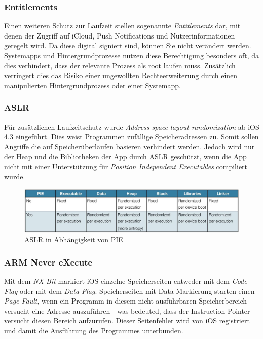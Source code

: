 		\subsubsection{Entitlements}
			Einen weiteren Schutz zur Laufzeit stellen sogenannte \textsl{Entitlements}
			dar, mit denen der Zugriff auf iCloud, Push	Notifications und
			Nutzerinformationen geregelt wird. Da diese digital signiert sind, können Sie
			nicht verändert werden. Systemapps und Hintergrundprozesse nutzen diese
			Berechtigung besonders oft, da dies verhindert, dass der relevante Prozess als
			root laufen muss. Zusätzlich verringert dies das Risiko einer ungewollten
			Rechteerweiterung durch einen manipulierten Hintergrundprozess oder einer
			Systemapp.
		
		\subsubsection{ASLR}
			Für zusätzlichen Laufzeitschutz wurde \textsl{Address space layout
			randomization}\cite[S.1]{iOS4SecurityEvalutaion} ab iOS 4.3 eingeführt. Dies
			weist Programmen zufällige Speicheradressen zu. Somit sollen Angriffe die auf
			Speicherüberläufen basieren verhindert werden\cite[S.131]{Levin2012}. Jedoch
			wird nur der Heap und die Bibliotheken der App durch ASLR geschützt, wenn
			die App nicht mit einer Unterstützung für \textsl{Position Independent
			Executables} compiliert wurde.
			\begin{figure}[h]
				\centering
				\includegraphics[width=0.9\linewidth]{ios/media/aslr-pie.jpg}
				\caption{ASLR in Abhängigkeit von PIE
				\cite[S.1]{iOS4SecurityEvalutaion}}
				\label{fig:aslr}
			\end{figure}
		
		\subsubsection{ARM Never eXecute}
			Mit dem \textsl{NX-Bit} markiert iOS einzelne Speicherseiten entweder mit dem
			\textsl{Code-Flag} oder mit dem \textsl{Data-Flag}. Speicherseiten mit
			Data-Markierung starten einen \textsl{Page-Fault}, wenn ein Programm in
			diesem nicht ausführbaren Speicherbereich versucht eine Adresse auszuführen
			- was bedeuted, dass der Instruction Pointer versucht diesen Bereich
			aufzurufen. Dieser Seitenfehler wird von iOS registriert und damit die
			Ausführung des Programmes unterbunden\cite[S.310]{Levin2012}.